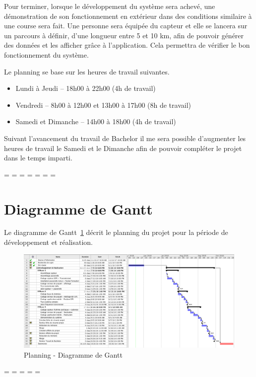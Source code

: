Pour terminer, lorsque le développement du système sera achevé, une démonstration de son fonctionnement en extérieur dans des conditions similaire à une course sera fait. Une personne sera équipée du capteur et elle se lancera sur un parcours à définir, d’une longueur entre 5 et 10 km, afin de pouvoir générer des données et les afficher grâce à l’application. Cela permettra de vérifier le bon fonctionnement du système.

Le planning se base sur les heures de travail suivantes.

\begin{itemize}
\item Lundi à Jeudi – 18h00 à 22h00 (4h de travail)
\item Vendredi – 8h00 à 12h00 et 13h00 à 17h00 (8h de travail)
\item Samedi et Dimanche – 14h00 à 18h00 (4h de travail)
\end{itemize}

Suivant l’avancement du travail de Bachelor il me sera possible d’augmenter les heures de travail le Samedi et le Dimanche afin de pouvoir compléter le projet dans le temps imparti. 


\newpage

\paperwidth=\pdfpageheight
\paperheight=\pdfpagewidth
\pdfpageheight=\paperheight
\pdfpagewidth=\paperwidth
\headwidth=\textheight
\begingroup 
\vsize=\textwidth
\hsize=\textheight
\section{Diagramme de Gantt}

Le diagramme de Gantt~\ref{fig:planning} décrit le planning du projet pour la période de développement et réalisation.

\begin{figure}[h]
\centering
\includegraphics[scale=0.45]{../../planning/gantt_planning.png}
\caption[Planning - Diagramme de Gantt]{Planning - Diagramme de Gantt}
\label{fig:planning}
\end{figure}
\endgroup
\newpage
\paperwidth=\pdfpageheight
\paperheight=\pdfpagewidth
\pdfpageheight=\paperheight
\pdfpagewidth=\paperwidth
\headwidth=\textwidth

